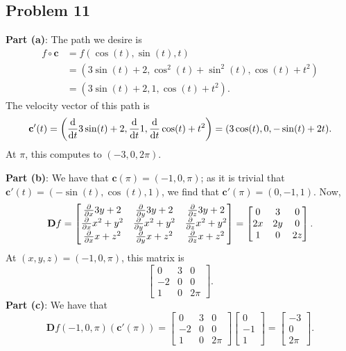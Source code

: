 \documentclass[11pt]{article}
\renewcommand{\vec}[1]{\mathbf{#1}}
\newcommand{\mat}[1]{\mathbf{#1}}
\begin{document}

\subsection{Problem 11}

\textbf{Part (a)}: The path we desire is
\begin{align*}
	f \circ \vec{c} &= f(\cos(t), \sin(t), t) \\
	&= (3\sin(t) + 2, \cos^{2}(t) + \sin^{2}(t), \cos(t) + t^{2}) \\
	&= (3\sin(t) + 2, 1, \cos(t) + t^{2}).
\end{align*}
The velocity vector of this path is
\[
	\vec{c}'(t) = \left(\dv{t} 3\sin(t) + 2, \dv{t} 1, \dv{t} \cos(t) + t^{2}\right) = (3\cos(t), 0, -\sin(t) + 2t).
\]
At $\pi$, this computes to $\boxed{(-3, 0, 2\pi)}$.

\textbf{Part (b)}: We have that $\vec{c}(\pi) = (-1, 0, \pi)$; as it is trivial that $\vec{c}'(t) = (-\sin(t), \cos(t), 1)$, we find that $\vec{c}'(\pi) = (0, -1, 1)$. Now,
\[
	\mat{D}f = \begin{bmatrix} \pdv{x} 3y + 2 & \pdv{y} 3y + 2 & \pdv{z} 3y + 2 \\ \pdv{x} x^{2} + y^{2} & \pdv{y} x^{2} + y^{2} & \pdv{z} x^{2} + y^{2} \\ \pdv{x} x + z^{2} & \pdv{y} x + z^{2} & \pdv{z} x + z^{2} \end{bmatrix} = \begin{bmatrix} 0 & 3 & 0 \\ 2x & 2y & 0 \\ 1 & 0 & 2z \end{bmatrix}.
\]
At $(x, y, z) = (-1, 0, \pi)$, this matrix is
\[
	\begin{bmatrix} 0 & 3 & 0 \\ -2 & 0 & 0 \\ 1 & 0 & 2\pi \end{bmatrix}.
\]
\textbf{Part (c)}: We have that
\[
	\mat{D}f(-1, 0, \pi)(\vec{c}'(\pi)) = \begin{bmatrix} 0 & 3 & 0 \\ -2 & 0 & 0 \\ 1 & 0 & 2\pi \end{bmatrix} \begin{bmatrix} 0 \\ -1 \\ 1 \end{bmatrix} = \begin{bmatrix} -3 \\ 0 \\ 2\pi \end{bmatrix}.
\]
\end{document}
